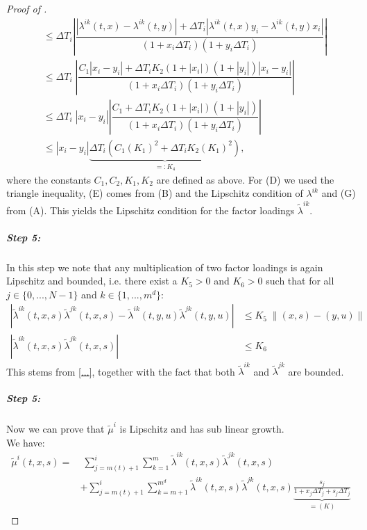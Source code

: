 \documentclass[12pt]{article}
\begin{document}
\begin{proof}[Proof of ]
\begin{align*}
			&\le \Delta T_i \left|\dfrac{\left|\lambda^{i k}(t,x) - \lambda^{i k}(t,y)\right| + \Delta T_i \left|\lambda^{i k}(t,x) y_i - \lambda^{i k}(t,y)x_i\right|}{\left(1 + x_i\Delta T_i\right)\left(1 + y_i\Delta T_i\right)}\right|\tag{D}\\
			&\le \Delta T_i \;\left|\dfrac{C_1\left|x_i - y_i\right| + \Delta T_i K_2 \left(1 + \left|x_i\right|\right)\left( 1 +\left| y_i \right| \right) \left|x_i - y_i\right|}{\left(1 + x_i\Delta T_i\right)\left(1 + y_i\Delta T_i\right)}\right|\tag{E}\\
			&\le \Delta T_i \;\left|x_i - y_i\right|\left|\dfrac{C_1 + \Delta T_i K_2 \left(1 + \left|x_i\right|\right) \left( 1 +\left| y_i \right| \right)}{\left(1 + x_i\Delta T_i\right)\left(1 + y_i\Delta T_i\right)}\right|\tag{F}\\
			&\le \left|x_i - y_i\right| \underbrace{\Delta T_i \left(C_1 \left(K_1\right)^2 +\Delta T_i  K_2 \left(K_1\right)^2\right)}_{=:K_4},\tag{G}
		\end{align*}
		where the constants $C_1, C_2, K_1, K_2$ are defined as above. For (D) we used the triangle inequality, (E) comes from (B) and the Lipschitz condition of $\lambda^{i k}$ and (G) from (A). This yields the Lipschitz condition for the factor loadings $\tilde{\lambda}^{ik}$.
		\subparagraph{Step 5:}
		In this step we note that any multiplication of two factor loadings is again Lipschitz and bounded, i.e. there exist a $K_5 > 0$ and $K_6>0$ such that for all $j \in \{0,...,N-1\}$ and $k\in\{1,...,m^d\}$:
		\begin{align*}
			\left|\tilde{\lambda}^{i k}\left(t,x, s\right)\tilde{\lambda}^{j k}\left(t,x, s\right) - \tilde{\lambda}^{i k}\left(t,y, u\right)\tilde{\lambda}^{j k}\left(t,y, u\right)\right| &\le K_5\; \lVert(x,s) - (y,u)\rVert \\
			\left|\tilde{\lambda}^{i k}\left(t,x, s\right)\tilde{\lambda}^{j k}\left(t,x, s\right)\right| &\le K_6\tag{H}
		\end{align*}
		This stems from \cref{...}, together with the fact that both $\tilde{\lambda}^{i k}$ and $\tilde{\lambda}^{j k}$ are bounded.
		\subparagraph{Step 5:}
		Now we can prove that $\tilde{\mu}^i$ is Lipschitz and has sub linear growth.\\
		We have:
		\begin{align*}
			\tilde{\mu}^i\left(t,x,s\right) = &\; \sum_{j=m(t)+1}^{i}\sum_{k=1}^{m}\tilde{\lambda}^{i k}\left(t, x, s\right)\tilde{\lambda}^{j k}\left(t, x, s\right)\tag{I}\\
			&+ \sum_{j=m(t)+1}^{i}  \sum_{k=m+1}^{m^d}  \tilde{\lambda}^{i k}\left(t, x, s\right)\tilde{\lambda}^{j k}\left(t, x, s\right)\underbrace{\frac{s_j}{1 + x_j\Delta T_j + s_j\Delta T_j}}_{=(K)}\tag{J}

\end{align*}
\end{proof}
\end{document}

